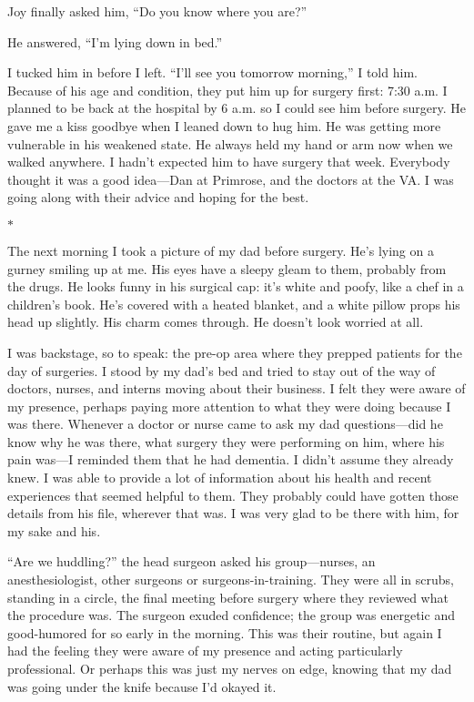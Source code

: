 \documentclass[12pt]{book}
\begin{document}
Joy finally asked him, ``Do you know where you are?''

He answered, ``I'm lying down in bed.''

I tucked him in before I left. ``I'll see you tomorrow morning,'' I told him. Because of his age and condition, they put him up for surgery first: 7:30 a.m. I planned to be back at the hospital by 6 a.m. so I could see him before surgery. He gave me a kiss goodbye when I leaned down to hug him. He was getting more vulnerable in his weakened state. He always held my hand or arm now when we walked anywhere. I hadn't expected him to have surgery that week. Everybody thought it was a good idea---Dan at Primrose, and the doctors at the VA. I was going along with their advice and hoping for the best.

\begin{center}$*$\end{center}

The next morning I took a picture of my dad before surgery. He's lying on a gurney smiling up at me. His eyes have a sleepy gleam to them, probably from the drugs. He looks funny in his surgical cap: it's white and poofy, like a chef in a children's book. He's covered with a heated blanket, and a white pillow props his head up slightly. His charm comes through. He doesn't look worried at all.

I was backstage, so to speak: the pre-op area where they prepped patients for the day of surgeries. I stood by my dad's bed and tried to stay out of the way of doctors, nurses, and interns moving about their business. I felt they were aware of my presence, perhaps paying more attention to what they were doing because I was there. Whenever a doctor or nurse came to ask my dad questions---did he know why he was there, what surgery they were performing on him, where his pain was---I reminded them that he had dementia. I didn't assume they already knew. I was able to provide a lot of information about his health and recent experiences that seemed helpful to them. They probably could have gotten those details from his file, wherever that was. I was very glad to be there with him, for my sake and his.

``Are we huddling?'' the head surgeon asked his group---nurses, an anesthesiologist, other surgeons or surgeons-in-training. They were all in scrubs, standing in a circle, the final meeting before surgery where they reviewed what the procedure was. The surgeon exuded confidence; the group was energetic and good-humored for so early in the morning. This was their routine, but again I had the feeling they were aware of my presence and acting particularly professional. Or perhaps this was just my nerves on edge, knowing that my dad was going under the knife because I'd okayed it.
\end{document}
